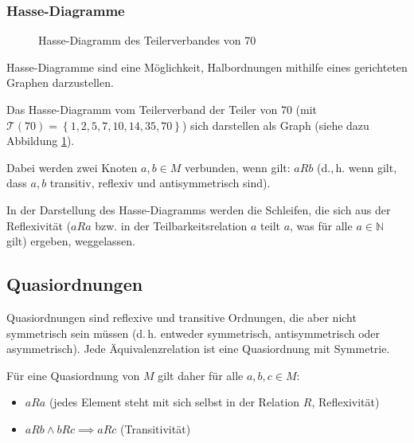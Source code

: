 \documentclass{scrartcl}
\begin{document}
\subsubsection{Hasse-Diagramme}


\begin{figure}
	\centering
	\caption{Hasse-Diagramm des Teilerverbandes von 70}
	\label{hasse}
\end{figure}

Hasse-Diagramme sind eine Möglichkeit, Halbordnungen mithilfe eines
gerichteten Graphen darzustellen. 

Das Hasse-Diagramm vom Teilerverband der Teiler von 70 (mit 
$\mathcal{T}(70) = \left\{1, 2, 5, 7, 10, 14, 35, 70\right\}$) sich darstellen als
Graph (siehe dazu Abbildung \ref{hasse}).

Dabei werden zwei Knoten $a, b \in M$ verbunden, wenn gilt: $aRb$ (d.,\,h. wenn
gilt, dass $a, b$ transitiv, reflexiv und antisymmetrisch sind). 

In der Darstellung
des Hasse-Diagramms werden die Schleifen, die sich aus der Reflexivität ($aRa$ bzw.
in der Teilbarkeitsrelation $a$ teilt $a$, was für alle $a \in \mathbb{N}$ gilt) 
ergeben, weggelassen.

\subsection{Quasiordnungen}

Quasiordnungen sind reflexive und transitive Ordnungen, die aber nicht symmetrisch 
sein müssen (d.\,h. entweder symmetrisch, antisymmetrisch oder asymmetrisch). Jede
Äquivalenzrelation ist eine Quasiordnung mit Symmetrie.

Für eine Quasiordnung von $M$ gilt daher für alle $a, b, c \in M$:

\begin{itemize}
	\item $aRa$ (jedes Element steht mit sich selbst in der Relation 
		$R$, Reflexivität)
	\item $aRb \wedge bRc \implies aRc$ (Transitivität)
\end{itemize}
\end{document}
